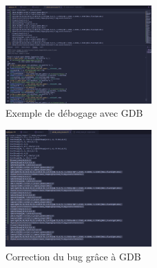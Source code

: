 \documentclass[10pt]{article}
\begin{document}
\begin{multicols}{2}
\begin{figure}[H]
    \centering
    \includegraphics[width=0.5\textwidth]{images/gdb.png}
    \caption{Exemple de débogage avec GDB}
    \label{fig:debug}
\end{figure}

\begin{figure}[H]
    \centering
    \includegraphics[width=0.5\textwidth]{images/gdb_fix.png}
    \caption{Correction du bug grâce à GDB}
    \label{fig:fix}
\end{figure}
\end{multicols}
\end{document}

